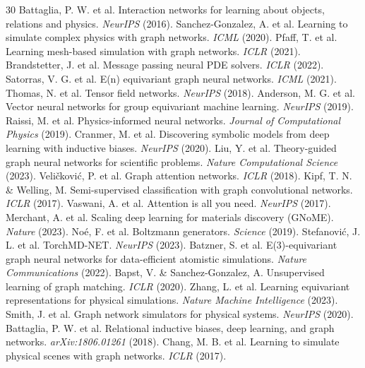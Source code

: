 \documentclass[10pt,twocolumn]{article}
\begin{document}
\begin{thebibliography}{30}
 Battaglia, P. W. et al. Interaction networks for learning about objects, relations and physics. \textit{NeurIPS} (2016).
 Sanchez-Gonzalez, A. et al. Learning to simulate complex physics with graph networks. \textit{ICML} (2020).
 Pfaff, T. et al. Learning mesh-based simulation with graph networks. \textit{ICLR} (2021).
 Brandstetter, J. et al. Message passing neural PDE solvers. \textit{ICLR} (2022).
 Satorras, V. G. et al. E(n) equivariant graph neural networks. \textit{ICML} (2021).
 Thomas, N. et al. Tensor field networks. \textit{NeurIPS} (2018).
 Anderson, M. G. et al. Vector neural networks for group equivariant machine learning. \textit{NeurIPS} (2019).
 Raissi, M. et al. Physics-informed neural networks. \textit{Journal of Computational Physics} (2019).
 Cranmer, M. et al. Discovering symbolic models from deep learning with inductive biases. \textit{NeurIPS} (2020).
 Liu, Y. et al. Theory-guided graph neural networks for scientific problems. \textit{Nature Computational Science} (2023).
 Veli\v{c}kovi\'{c}, P. et al. Graph attention networks. \textit{ICLR} (2018).
 Kipf, T. N. \& Welling, M. Semi-supervised classification with graph convolutional networks. \textit{ICLR} (2017).
 Vaswani, A. et al. Attention is all you need. \textit{NeurIPS} (2017).
 Merchant, A. et al. Scaling deep learning for materials discovery (GNoME). \textit{Nature} (2023).
 No\'{e}, F. et al. Boltzmann generators. \textit{Science} (2019).
 Stefanovi\'{c}, J. L. et al. TorchMD-NET. \textit{NeurIPS} (2023).
 Batzner, S. et al. E(3)-equivariant graph neural networks for data-efficient atomistic simulations. \textit{Nature Communications} (2022).
 Bapst, V. \& Sanchez-Gonzalez, A. Unsupervised learning of graph matching. \textit{ICLR} (2020).
 Zhang, L. et al. Learning equivariant representations for physical simulations. \textit{Nature Machine Intelligence} (2023).
 Smith, J. et al. Graph network simulators for physical systems. \textit{NeurIPS} (2020).
 Battaglia, P. W. et al. Relational inductive biases, deep learning, and graph networks. \textit{arXiv:1806.01261} (2018).
 Chang, M. B. et al. Learning to simulate physical scenes with graph networks. \textit{ICLR} (2017).

\end{thebibliography}
\end{document}

